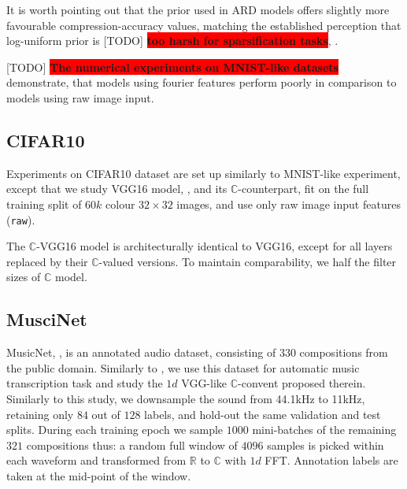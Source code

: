 \documentclass[a4paper,10pt]{article}
\newcommand{\real}{\mathbb{R}}
\newcommand{\cplx}{\mathbb{C}}
\newcommand{\important}[1]{\textbf{\!\colorbox{red}{#1}\!}}
\newcommand{\todo}[1]{{\color{blue} [TODO]} \important{#1}}
\begin{document}
It is worth pointing out that the prior used in ARD models offers slightly more favourable
compression-accuracy values, matching the established perception that log-uniform prior
is \todo{too harsh for sparsification tasks}, \citep{kharitonov_variational_2018}.

\todo{The numerical experiments on MNIST-like datasets} demonstrate, that models using fourier
features perform poorly in comparison to models using raw image input.



\subsection{CIFAR10} %
\label{sub:cifar10}

Experiments on CIFAR10 dataset are set up similarly to MNIST-like experiment, except
that we study VGG16 model, \citep{simonyan_very_2015}, and its $\cplx$-counterpart, fit
on the full training split of $60k$ colour $32\times32$ images, and use only raw image
input features (\texttt{raw}).

The $\cplx$-VGG16 model is architecturally identical to VGG16, except for all layers
replaced by their $\cplx$-valued versions. To maintain comparability, we half the filter
sizes of $\cplx$ model.






\subsection{MusciNet} %
\label{sub:muscinet}

MusicNet, \citep{thickstun_learning_2017}, is an annotated audio dataset, consisting of $330$
compositions from the public domain. Similarly to \citep{trabelsi_deep_2017}, we use this
dataset for automatic music transcription task and study the $1d$ VGG-like $\cplx$-convent
proposed therein. Similarly to this study, we downsample the sound from 44.1kHz to 11kHz,
retaining only $84$ out of $128$ labels, and hold-out the same validation and test splits.
During each training epoch we sample $1000$ mini-batches of the remaining $321$ compositions
thus: a random full window of $4096$ samples is picked within each waveform and transformed
from $\real$ to $\cplx$ with $1d$ FFT. Annotation labels are taken at the mid-point of the
window.
\end{document}
